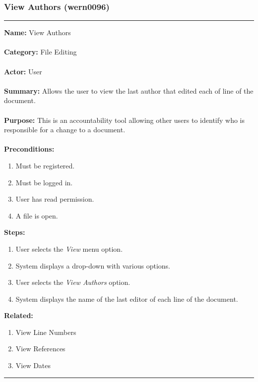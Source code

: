 \documentclass[11pt]{report}
\begin{document}
\subsubsection{View Authors (wern0096)}
\vspace{2pt}
\hrule
\vspace{8pt}
	\noindent\textbf{Name:} View Authors \\ \\
	\textbf{Category:} File Editing \\ \\
	\textbf{Actor:} User \\ \\
	\textbf{Summary:} Allows the user to view the last author that edited each of line of the document. \\ \\
	\textbf{Purpose:} This is an accountability tool allowing other users to identify who is responsible for a change to a document. \\ \\
	\textbf{Preconditions:} 
	\begin{enumerate}
		\item Must be registered.
		\item Must be logged in.
		\item User has read permission.
		\item A file is open.
	\end{enumerate}
	\textbf{Steps:}
	\begin{enumerate}
		\item User selects the \textit{View} menu option.
		\item System displays a drop-down with various options.
		\item User selects the \textit{View Authors} option.
		\item System displays the name of the last editor of each line of the document.
	\end{enumerate}
	\textbf{Related:}
	\begin{enumerate}
		\item View Line Numbers
		\item View References
		\item View Dates
	\end{enumerate}
\vspace{8pt}
\hrule
\newpage
\end{document}
